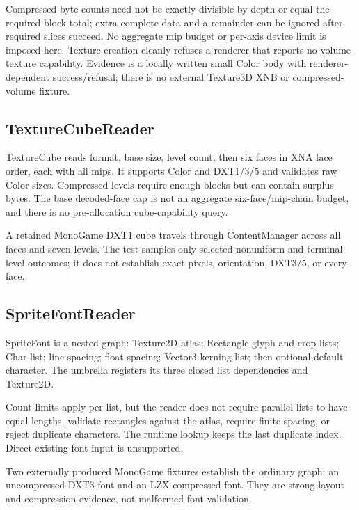 Compressed byte counts need not be exactly divisible by depth or equal the required block total;
extra complete data and a remainder can be ignored after required slices succeed. No aggregate
mip budget or per-axis device limit is imposed here. Texture creation cleanly refuses a renderer
that reports no volume-texture capability. Evidence is a locally written small Color body with
renderer-dependent success/refusal; there is no external Texture3D XNB or compressed-volume
fixture.

\subsection{TextureCubeReader}
\label{sec:xnb-texturecube-reader-contract}

TextureCube reads format, base size, level count, then six faces in XNA face order, each with all
mips. It supports Color and DXT1/3/5 and validates raw Color sizes. Compressed levels require
enough blocks but can contain surplus bytes. The base decoded-face cap is not an aggregate
six-face/mip-chain budget, and there is no pre-allocation cube-capability query.

A retained MonoGame DXT1 cube travels through ContentManager across all faces and seven levels.
The test samples only selected nonuniform and terminal-level outcomes; it does not establish exact
pixels, orientation, DXT3/5, or every face.

\subsection{SpriteFontReader}
\label{sec:xnb-spritefont-reader-contract}

SpriteFont is a nested graph: Texture2D atlas; Rectangle glyph and crop lists; Char list; line
spacing; float spacing; Vector3 kerning list; then optional default character. The umbrella
registers its three closed list dependencies and Texture2D.

Count limits apply per list, but the reader does not require parallel lists to have equal lengths,
validate rectangles against the atlas, require finite spacing, or reject duplicate characters.
The runtime lookup keeps the last duplicate index. Direct existing-font input is unsupported.

Two externally produced MonoGame fixtures establish the ordinary graph: an uncompressed DXT3
font and an LZX-compressed font. They are strong layout and compression evidence, not malformed
font validation.

